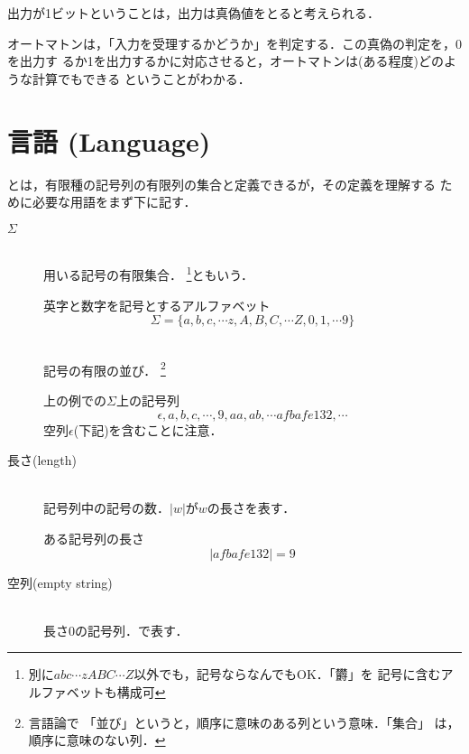 出力が1ビットということは，出力は真偽値をとると考えられる．

オートマトンは，「入力を受理するかどうか」を判定する．この真偽の判定を，0を出力す
るか1を出力するかに対応させると，オートマトンは(ある程度)どのような計算でもできる
ということがわかる．

\section{言語 (Language)}
とは，有限種の記号列の有限列の集合と定義できるが，その定義を理解する
ために必要な用語をまず下に記す．

\begin{description}
 \item [$\Sigma$] \mbox{} \\
 用いる記号の有限集合．
       \footnote{別に$abc\cdots zABC\cdots Z$以外でも，記号ならなんでもOK．「欝」を
       記号に含むアルファベットも構成可}ともいう．
             \begin{myexample}{英字と数字を記号とするアルファベット}
              \[
              \Sigma = \{a,b,c,\cdots z,A,B,C,\cdots Z,0,1,\cdots 9\}
              \]
             \end{myexample}

 \item [] \mbox{} \\
 記号の有限の並び． \footnote{言語論で
             「並び」というと，順序に意味のある列という意味．「集合」
             は，順序に意味のない列．}
             \begin{myexample}{上の例での$\Sigma$上の記号列}
              \[
              \epsilon, a, b, c, \cdots , 9, aa, ab, \cdots  afbafe132, \cdots 
              \]
              空列$\epsilon$(下記)を含むことに注意．
             \end{myexample}

 \item[長さ(length)] \mbox{} \\
            記号列中の記号の数．$|w|$が$w$の長さを表す．
            \begin{myexample}{ある記号列の長さ}
             \[
              |afbafe132| = 9
             \]
            \end{myexample}

 \item[空列(empty string)] \mbox{} \\
長さ0の記号列．\mystrong{$\epsilon$}で表す．
\end{description}

